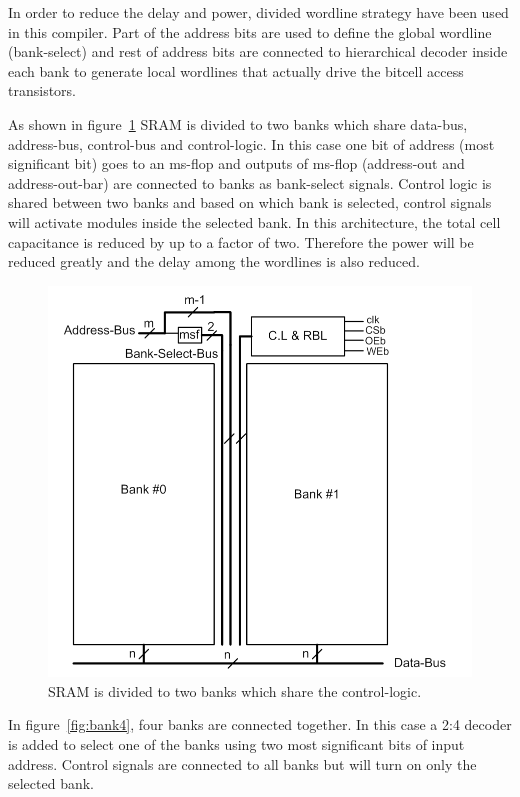 In order to reduce the delay and power, divided wordline strategy have been used in this compiler. Part of the address bits 
are used to define the global wordline (bank-select) and rest of address bits are connected to hierarchical 
decoder inside each bank to generate local wordlines that actually drive the bitcell access transistors. 

As shown in figure~\ref{fig:bank2} SRAM is divided to two banks which share data-bus, address-bus, control-bus and control-logic. 
In this case one bit of address (most significant bit) goes to an ms-flop and outputs of ms-flop (address-out and address-out-bar) 
are connected to banks as bank-select signals. Control logic is shared between two banks and based on which bank is selected, 
control signals will activate modules inside the selected bank. In this architecture, the total cell capacitance is reduced by up 
to a factor of two. Therefore the power will be reduced greatly and the delay among the wordlines is also reduced.

\begin{figure}[h!]
\centering
\includegraphics[scale=.9]{./figs/bank2.pdf}
\caption{SRAM is divided to two banks which share the control-logic.}
\label{fig:bank2}
\end{figure}

In figure~\ref{fig:bank4}, four banks are connected together. In this case a 2:4 decoder is added to select one of the banks using two 
most significant bits of input address. Control signals are connected to all banks but will turn on only the selected bank.



